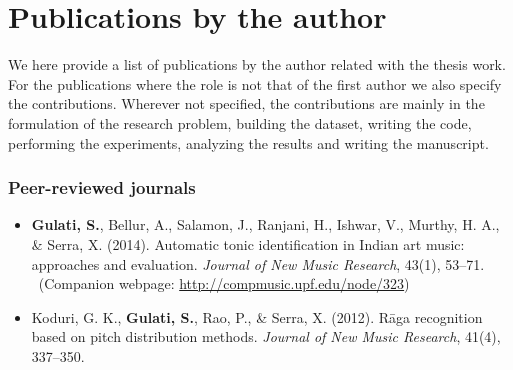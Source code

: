 \newcommand\contrib[1]{\\~{\footnotesize (#1)}}
% 
\newcommand\resource[2]{
	\noindent #1 \par
	\vspace{0.2em}
	{\centering	\url{#2} \par}
	\vspace{0.5em}
	\hrule \par 
	\vspace{0.8em} \par}
%
%
\chapter[Publications by the author][Publications by the author]{Publications by the author}\label{app:mypapers}%

We here provide a list of publications by the author related with the thesis work. For the publications where the role is not that of the first author we  also specify the contributions. Wherever not specified, the contributions are mainly in the formulation of the research problem, building the dataset, writing the code, performing the experiments, analyzing the results and writing the manuscript.

\subsection*{Peer-reviewed journals}
\begin{itemize}[leftmargin=*]
	\item \textbf{Gulati, S.}, Bellur, A., Salamon, J., Ranjani, H., Ishwar, V., Murthy, H. A., \& Serra, X. (2014). Automatic tonic identification in Indian art music: approaches and evaluation. \textit{Journal of New Music Research}, 43(1), 53–71.
	\contrib{Companion webpage: \url{http://compmusic.upf.edu/node/323}}
	\item Koduri, G. K., \textbf{Gulati, S.}, Rao, P., \& Serra, X. (2012). R\={a}ga recognition based on pitch distribution methods. \textit{Journal of New Music Research}, 41(4), 337–350.
\end{itemize}
%
